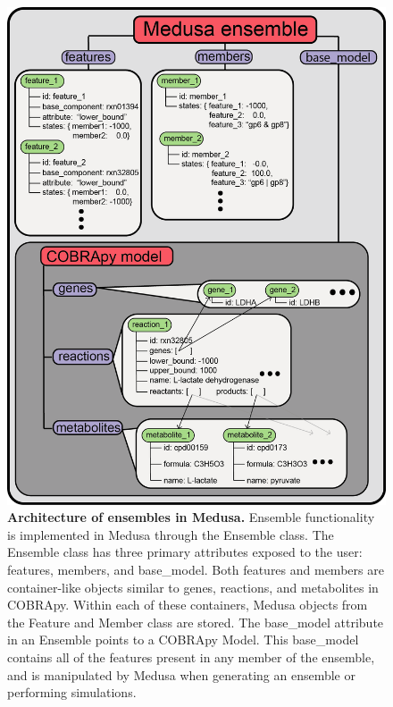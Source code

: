 \documentclass[11pt,twocolumn,notitlepage,openany,twoside]{book}
\begin{document}
\begin{refsection}
\begin{figure}[tb]
\centering
\includegraphics[width=\linewidth]{ch4_fig1}
\caption[ Architecture of ensembles in Medusa.]{\textbf{ Architecture of ensembles in Medusa.} Ensemble functionality is implemented in Medusa through the Ensemble class. The Ensemble class has three primary attributes exposed to the user: features, members, and base\_model. Both features and members are container-like objects similar to genes, reactions, and metabolites in COBRApy. Within each of these containers, Medusa objects from the Feature and Member class are stored. The base\_model attribute in an Ensemble points to a COBRApy Model. This base\_model contains all of the features present in any member of the ensemble, and is manipulated by Medusa when generating an ensemble or performing simulations.}
\end{figure}


\end{refsection}
\end{document}
